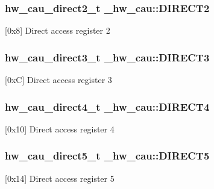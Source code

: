 \subsubsection[{\texorpdfstring{D\+I\+R\+E\+C\+T2}{DIRECT2}}]{ {\bf hw\+\_\+cau\+\_\+direct2\+\_\+t} \+\_\+hw\+\_\+cau\+::\+D\+I\+R\+E\+C\+T2}\hypertarget{struct__hw__cau_a12dd9b41ee7760f7da58cbd186a69690}{}\label{struct__hw__cau_a12dd9b41ee7760f7da58cbd186a69690}
\mbox{[}0x8\mbox{]} Direct access register 2 
\subsubsection[{\texorpdfstring{D\+I\+R\+E\+C\+T3}{DIRECT3}}]{ {\bf hw\+\_\+cau\+\_\+direct3\+\_\+t} \+\_\+hw\+\_\+cau\+::\+D\+I\+R\+E\+C\+T3}\hypertarget{struct__hw__cau_a6b2b193ac1edf47d33b27544da8e505d}{}\label{struct__hw__cau_a6b2b193ac1edf47d33b27544da8e505d}
\mbox{[}0xC\mbox{]} Direct access register 3 
\subsubsection[{\texorpdfstring{D\+I\+R\+E\+C\+T4}{DIRECT4}}]{ {\bf hw\+\_\+cau\+\_\+direct4\+\_\+t} \+\_\+hw\+\_\+cau\+::\+D\+I\+R\+E\+C\+T4}\hypertarget{struct__hw__cau_a543dc9717837533c5b10294e5226a3a4}{}\label{struct__hw__cau_a543dc9717837533c5b10294e5226a3a4}
\mbox{[}0x10\mbox{]} Direct access register 4 
\subsubsection[{\texorpdfstring{D\+I\+R\+E\+C\+T5}{DIRECT5}}]{ {\bf hw\+\_\+cau\+\_\+direct5\+\_\+t} \+\_\+hw\+\_\+cau\+::\+D\+I\+R\+E\+C\+T5}\hypertarget{struct__hw__cau_a722c01b30411f6c16c483a0038df86c5}{}\label{struct__hw__cau_a722c01b30411f6c16c483a0038df86c5}
\mbox{[}0x14\mbox{]} Direct access register 5 
